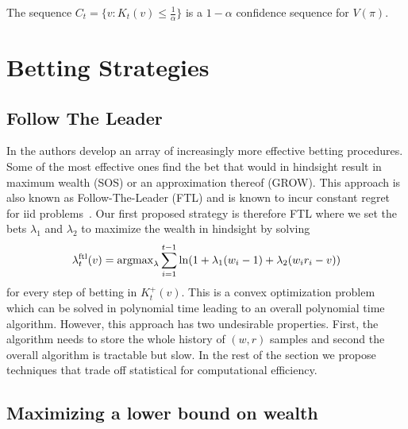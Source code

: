 \begin{theorem}
\label{thm:cs}
The sequence $C_t = \{v:K_t(v)\leq \frac{1}{\alpha}\}$ is a $1-\alpha$ confidence sequence for $V(\pi)$.
\end{theorem}

\section{Betting Strategies}

\subsection{Follow The Leader}
In \cite{waudby-smith_variance-adaptive_2020} the authors develop
an array of increasingly more effective betting procedures. 
Some of the most effective ones find the bet that would in hindsight
result in maximum wealth (SOS) or an approximation thereof (GROW).
This approach is also known as Follow-The-Leader (FTL) and is 
known to incur constant regret for iid 
problems~\cite{de2014follow}. Our first proposed strategy 
is therefore FTL where we set the 
bets $\lambda_1$ and $\lambda_2$ to maximize the wealth in hindsight
by solving
\begin{equation}
\lambda_{t}^{\textrm{ftl}}(v) = \operatorname{argmax}_{\lambda} \sum_{i=1}^{t-1} \ln(1+\lambda_1 (w_i-1)+\lambda_2(w_i r_i - v)) \label{eq:ftl}
\end{equation}
for every step of betting in $K_t^{+}(v)$. This is a convex optimization problem which can be solved in polynomial time
leading to an overall polynomial time algorithm. However,
this approach has two undesirable properties. First, the 
algorithm needs to store the whole history of $(w,r)$ samples
and second the overall algorithm is tractable but slow.
In the rest of the section we propose techniques that trade off
statistical for computational efficiency.

\subsection{Maximizing a lower bound on wealth}

